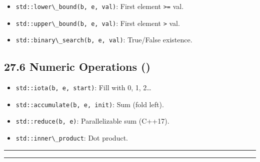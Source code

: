 \begin{itemize}
\tightlist
\item
  \passthrough{\lstinline!std::lower\_bound(b, e, val)!}: First element
  \passthrough{\lstinline!>=!} val.
\item
  \passthrough{\lstinline!std::upper\_bound(b, e, val)!}: First element
  \passthrough{\lstinline!>!} val.
\item
  \passthrough{\lstinline!std::binary\_search(b, e, val)!}: True/False
  existence.
\end{itemize}

\hypertarget{numeric-operations}{%
\subsection{27.6 Numeric Operations ()}\label{numeric-operations}}

\begin{itemize}
\tightlist
\item
  \passthrough{\lstinline!std::iota(b, e, start)!}: Fill with 0, 1,
  2\ldots{}
\item
  \passthrough{\lstinline!std::accumulate(b, e, init)!}: Sum (fold
  left).
\item
  \passthrough{\lstinline!std::reduce(b, e)!}: Parallelizable sum
  (C++17).
\item
  \passthrough{\lstinline!std::inner\_product!}: Dot product.
\end{itemize}

\begin{center}\rule{0.5\linewidth}{0.5pt}\end{center}

\begin{center}\rule{0.5\linewidth}{0.5pt}\end{center}
